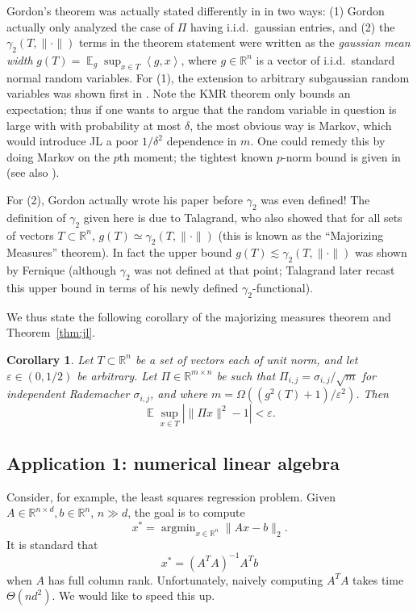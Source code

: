 \documentclass[12pt]{article}
\DeclareMathOperator*{\E}{\mathbb{E}}
\newcommand{\eps}{\varepsilon}
\newcommand{\inprod}[1]{\left\langle #1 \right\rangle}
\newcommand{\R}{\mathbb{R}}
\newtheorem{corollary}{Corollary}
\newcommand{\EquationName}[1]{\label{eq:#1}}
\newcommand{\CorollaryName}[1]{\label{cor:#1}}
\begin{document}
Gordon's theorem was actually stated differently in \cite{Gordon88} in two ways: (1) Gordon actually only analyzed the case of $\Pi$ having i.i.d.\ gaussian entries, and (2) the $\gamma_2(T,\|\cdot\|)$ terms in the theorem statement were written as the {\em gaussian mean width} $g(T) = \E_g \sup_{x\in T} \inprod{g,x}$, where $g\in\R^n$ is a vector of i.i.d.\ standard normal random variables. For (1), the extension to arbitrary subgaussian random variables was shown first in \cite{KlartagM05}. Note the KMR theorem only bounds an expectation; thus if one wants to argue that the random variable in question is large with with probability at most $\delta$, the most obvious way is Markov, which would introduce JL a poor $1/\delta^2$ dependence in $m$. One could remedy this by doing Markov on the $p$th moment; the tightest known $p$-norm bound is given in \cite[Theorem 6.5]{Dirksen13} (see also \cite[Theorem 4.8]{Dirksen14}).

For (2), Gordon actually wrote his paper before $\gamma_2$ was even defined! The definition of $\gamma_2$ given here is due to Talagrand, who also showed that for all sets of vectors $T\subset\R^n$, $g(T)\simeq \gamma_2(T, \|\cdot\|)$ \cite{Talagrand14} (this is known as the ``Majorizing Measures'' theorem). In fact the upper bound $g(T) \lesssim \gamma_2(T, \|\cdot\|)$ was shown by Fernique \cite{Fernique75} (although $\gamma_2$ was not defined at that point; Talagrand later recast this upper bound in terms of his newly defined $\gamma_2$-functional).

We thus state the following corollary of the majorizing measures theorem and Theorem~\ref{thm:jl}.

\begin{corollary}\CorollaryName{gordon}
Let $T\subset \R^n$ be a set of vectors each of unit norm, and let $\eps\in (0,1/2)$ be arbitrary. Let $\Pi\in\R^{m\times n}$ be such that $\Pi_{i,j} = \sigma_{i,j}/\sqrt{m}$ for independent Rademacher $\sigma_{i,j}$, and where $m = \Omega((g^2(T)+1) / \eps^2)$. Then
$$ \E \sup_{x\in T} \left|\|\Pi x\|^2 - 1 \right| < \eps .$$
\end{corollary}

\subsection{Application 1: numerical linear algebra}
Consider, for example, the least squares regression problem. Given $A\in\R^{n\times d}, b\in\R^n$, $n\gg d$, the goal is to compute
\begin{equation}\EquationName{lsr}
x^* = \mathop{argmin}_{x\in\R^n} \|Ax - b\|_2 .
\end{equation}
It is standard that
$$
x^* = (A^T A)^{-1} A^T b
$$
when $A$ has full column rank. Unfortunately, naively computing $A^T A$ takes time $\Theta(nd^2)$. We would like to speed this up.
\end{document}
